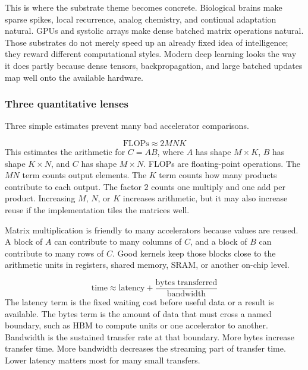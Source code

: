 This is where the substrate theme becomes concrete. Biological brains make sparse spikes, local recurrence, analog chemistry, and continual adaptation natural. GPUs and systolic arrays make dense batched matrix operations natural. Those substrates do not merely speed up an already fixed idea of intelligence; they reward different computational styles. Modern deep learning looks the way it does partly because dense tensors, backpropagation, and large batched updates map well onto the available hardware.

\subsubsection{Three quantitative lenses}

Three simple estimates prevent many bad accelerator comparisons.

\begin{keyequation}
\[
  \text{FLOPs} \approx 2M N K
\]
\tcblower
This estimates the arithmetic for \(C = AB\), where \(A\) has shape \(M \times K\), \(B\) has shape \(K \times N\), and \(C\) has shape \(M \times N\). FLOPs are floating-point operations. The \(M N\) term counts output elements. The \(K\) term counts how many products contribute to each output. The factor \(2\) counts one multiply and one add per product. Increasing \(M\), \(N\), or \(K\) increases arithmetic, but it may also increase reuse if the implementation tiles the matrices well.
\end{keyequation}

Matrix multiplication is friendly to many accelerators because values are reused. A block of \(A\) can contribute to many columns of \(C\), and a block of \(B\) can contribute to many rows of \(C\). Good kernels keep those blocks close to the arithmetic units in registers, shared memory, SRAM, or another on-chip level.

\begin{keyequation}
\[
  \text{time} \approx \text{latency} +
  \frac{\text{bytes transferred}}{\text{bandwidth}}
\]
\tcblower
The latency term is the fixed waiting cost before useful data or a result is available. The bytes term is the amount of data that must cross a named boundary, such as HBM to compute units or one accelerator to another. Bandwidth is the sustained transfer rate at that boundary. More bytes increase transfer time. More bandwidth decreases the streaming part of transfer time. Lower latency matters most for many small transfers.
\end{keyequation}

